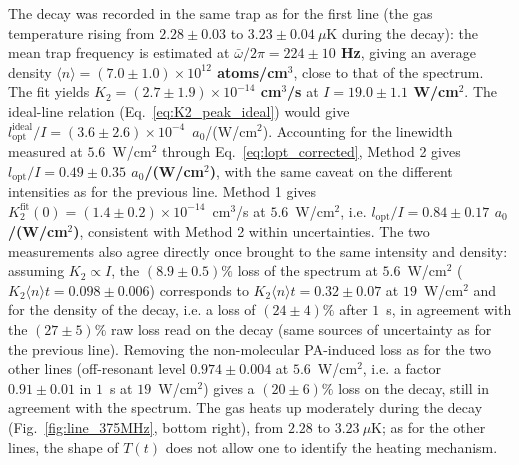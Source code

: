 The decay was recorded in the same trap as for the first line (the gas temperature rising
from $2.28\pm0.03$ to $3.23\pm0.04~\mu$K during the decay): the mean trap
frequency is estimated at \textbf{$\bar\omega/2\pi = 224\pm10$ Hz}, giving an average
density \textbf{$\langle n\rangle = (7.0\pm1.0)\times10^{12}$ atoms/cm$^3$}, close to that of
the spectrum. The fit yields
\textbf{$K_2 = (2.7\pm1.9)\times10^{-14}$ cm$^3$/s} at \textbf{$I=19.0\pm1.1$ W/cm$^2$}. The
ideal-line relation (Eq.~\ref{eq:K2_peak_ideal}) would give
$l_{\text{opt}}^{\text{ideal}}/I=(3.6\pm2.6)\times10^{-4}$~$a_0$/(W/cm$^2$).
Accounting for the linewidth measured at $5.6$~W/cm$^2$ through
Eq.~\ref{eq:lopt_corrected}, Method 2 gives
\textbf{$l_{\text{opt}}/I=0.49\pm0.35$ $a_0$/(W/cm$^2$)}, with the same caveat on the
different intensities as for the previous line. Method 1 gives
$K_2^{\text{fit}}(0) = (1.4\pm0.2)\times10^{-14}$~cm$^3$/s at $5.6$~W/cm$^2$, i.e.
\textbf{$l_{\text{opt}}/I=0.84\pm0.17$ $a_0$/(W/cm$^2$)}, consistent with Method 2 within
uncertainties. The two measurements also agree directly once brought to the same
intensity and density: assuming $K_2\propto I$, the $(8.9\pm0.5)\%$ loss of the spectrum
at $5.6$~W/cm$^2$ ($K_2\langle n\rangle t=0.098\pm0.006$) corresponds to
$K_2\langle n\rangle t=0.32\pm0.07$ at $19$~W/cm$^2$ and for the density of the decay,
i.e. a loss of $(24\pm4)\%$ after
$1$~s, in agreement with the $(27\pm5)\%$ raw loss read on the decay (same sources of
uncertainty as for the previous line). Removing the non-molecular PA-induced loss as for
the two other lines (off-resonant level $0.974\pm0.004$ at $5.6$~W/cm$^2$, i.e. a factor
$0.91\pm0.01$ in $1$~s at $19$~W/cm$^2$) gives a $(20\pm6)\%$ loss on the decay, still in
agreement with the spectrum. The
gas heats up moderately during the decay (Fig.~\ref{fig:line_375MHz}, bottom right), from
$2.28$ to $3.23~\mu$K; as for the other lines, the shape of $T(t)$ does not allow one to
identify the heating mechanism.


